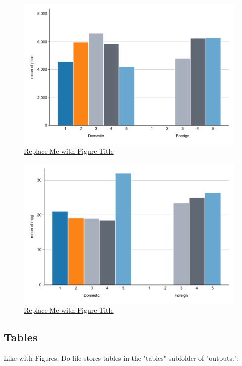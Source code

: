 \documentclass[12pt]{article}
\begin{document}
\begin{figure}[ht]
	\centering
	\caption{\underline{Replace Me with Figure Title}}
	\label{fig:Replace_Me_with_Ref_Label}
	\includegraphics[width=1\textwidth]
		{outputs/figures/pdf/figure_replace_me.pdf}
\end{figure}

\begin{figure}[ht]
	\centering
	\caption{\underline{Replace Me with Figure Title}}
	\label{fig:Replace_Me_with_Ref_Label1}
	\includegraphics[width=1\textwidth]
		{outputs/figures/pdf/figure_replace_me1.pdf}
\end{figure}

\subsection{Tables}

Like with Figures, 
Do-file stores tables in the "tables" subfolder of "outputs.": 
\end{document}
